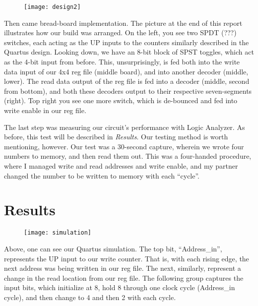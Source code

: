 \documentclass[titlepage]{article}
\begin{document}
        \begin{figure}[h]
        	\centering
        	\texttt{[image: design2]}
        \end{figure}
        
        Then came bread-board implementation.  The picture at the end of this report illustrates how our build was arranged.
        On the left, you see two SPDT (???) switches, each acting as the UP inputs to the counters similarly described in the Quartus design.
        Looking down, we have an 8-bit block of SPST toggles, which act as the 4-bit input from before.
        This, unsurprisingly, is fed both into the write data input of our 4x4 reg file (middle board), and into another decoder (middle, lower).
        The read data output of the reg file is fed into a decoder (middle, second from bottom), and both these decoders output to their respective seven-segments (right).
        Top right you see one more switch, which is de-bounced and fed into write enable in our reg file.
        
        
        
        The last step was measuring our circuit's performance with Logic Analyzer.  As before, this test will be described in \textit{Results}.  
        Our testing method is worth mentioning, however.
        Our test was a 30-second capture, wherein we wrote four numbers to memory, and then read them out.  
        This was a four-handed procedure, where I managed write and read addresses and write enable, and my partner changed the number to be written to memory with each ``cycle''.
        
        
    \section{Results}
    
        \begin{figure}[h]
        	\centering
        	\texttt{[image: simulation]}
        \end{figure}
    
        Above, one can see our Quartus simulation.  The top bit, ``Address\_in'', represents the UP input to our write counter.
        That is, with each rising edge, the next address was being written in our reg file.
        The next, similarly, represent a change in the read location from our reg file.
        The following group captures the input bits, which initialize at 8, hold 8 through one clock cycle (Address\_in cycle), and then change to 4 and then 2 with each cycle.
        
\end{document}
